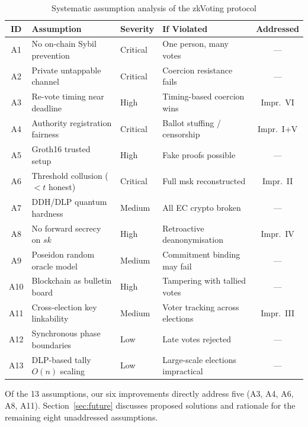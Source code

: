 \documentclass[conference]{IEEEtran}
\begin{document}
\begin{table}[t]
\centering
\caption{Systematic assumption analysis of the zkVoting protocol}
\label{tab:assumptions}
\renewcommand{\arraystretch}{1.15}
\begin{tabular}{clllc}
\toprule
\textbf{ID} & \textbf{Assumption} & \textbf{Severity} & \textbf{If Violated} & \textbf{Addressed} \\
\midrule
A1  & No on-chain Sybil prevention         & Critical & One person, many votes          & --- \\
A2  & Private untappable channel           & Critical & Coercion resistance fails       & --- \\
A3  & Re-vote timing near deadline        & High     & Timing-based coercion wins      & Impr.~VI \\
A4  & Authority registration fairness      & Critical & Ballot stuffing / censorship     & Impr.~I+V \\
A5  & Groth16 trusted setup               & High     & Fake proofs possible            & --- \\
A6  & Threshold collusion ($<t$ honest)    & Critical & Full msk reconstructed          & Impr.~II \\
A7  & DDH/DLP quantum hardness            & Medium   & All EC crypto broken            & --- \\
A8  & No forward secrecy on $\mathit{sk}$  & High     & Retroactive deanonymisation     & Impr.~IV \\
A9  & Poseidon random oracle model         & Medium   & Commitment binding may fail     & --- \\
A10 & Blockchain as bulletin board         & High     & Tampering with tallied votes     & --- \\
A11 & Cross-election key linkability       & Medium   & Voter tracking across elections & Impr.~III \\
A12 & Synchronous phase boundaries         & Low      & Late votes rejected             & --- \\
A13 & DLP-based tally $O(n)$ scaling       & Low      & Large-scale elections impractical & --- \\
\bottomrule
\end{tabular}
\end{table}

Of the 13 assumptions, our six improvements directly address five (A3, A4, A6, A8, A11).
Section~\ref{sec:future} discusses proposed solutions and rationale for the remaining
eight unaddressed assumptions.
\end{document}

